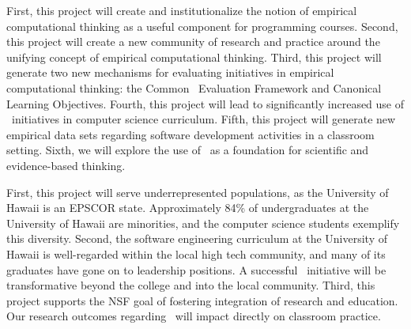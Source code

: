 \medskip

  First, this project will create and
institutionalize the notion of empirical computational thinking as a useful
component for programming courses. Second, this project will create a new
community of research and practice around the unifying concept of empirical
computational thinking.  Third, this project will generate two new
mechanisms for evaluating initiatives in empirical computational thinking:
the Common \eCT\ Evaluation Framework and Canonical \eCT Learning
Objectives. Fourth, this project will lead to significantly increased use
of \eCT\ initiatives in computer science curriculum. Fifth, this project
will generate new empirical data sets regarding software development
activities in a classroom setting. Sixth, we will explore the use of \eCT\
as a foundation for scientific and evidence-based thinking.

\medskip 

  First, this project will serve
underrepresented populations, as the University of Hawaii is an EPSCOR
state. Approximately 84\% of undergraduates at the University of Hawaii are
minorities, and the computer science students exemplify this diversity.
Second, the software engineering curriculum at the University of Hawaii is
well-regarded within the local high tech community, and many of its
graduates have gone on to leadership positions. A successful \eCT\
initiative will be transformative beyond the college and into the local
community.  Third, this project supports the NSF goal of fostering
integration of research and education.  Our research outcomes regarding \eCT\ will
impact directly on classroom practice.
